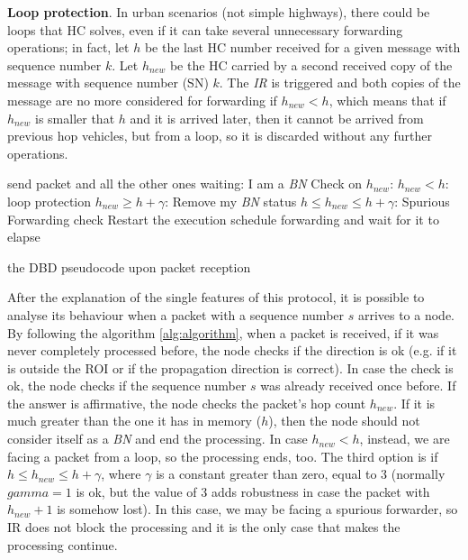 \documentclass{sig-alternate-2013}
\begin{document}
\textbf{Loop protection}. In urban scenarios (not simple highways), there could be loops that HC solves, even if it can take several unnecessary forwarding operations; in fact, let $h$ be the last HC number received for a given message with sequence number $k$. Let $h_{new}$ be the HC carried by a second received copy of the message with sequence number (SN) $k$. The \textit{IR} is triggered and both copies of the message are no more considered for forwarding if $h_{new}<h$, which means that if $h_{new}$ is smaller that $h$ and it is arrived later, then it cannot be arrived from previous hop vehicles, but from a loop, so it is discarded without any further operations.

\begin{algorithm}
\begin{algorithmic}
						\State {}
				    \EndIf
			    \Else {} 
			    \EndIf
		\Else {} 
	    \EndIf
\EndIf
\State
{}
    \State send packet and all the other ones waiting: I am a \textit{BN}
\EndFunction
{}
	\State Check on $h_{new}$:
	\State $h_{new}<h$: loop protection
	\State $h_{new} \geqslant h + \gamma$: Remove my \textit{BN} status
	\State $h \leqslant h_{new} \leqslant h + \gamma$: Spurious Forwarding check
	\State Restart the execution
\EndFunction
{}
			\State schedule forwarding and wait for it to elapse
			 
			\Else {} 
			\EndIf
\EndFunction
\caption{the DBD pseudocode upon packet reception}
\label{alg:algorithm}
\end{algorithmic}
\end{algorithm}

After the explanation of the single features of this protocol, it is possible to analyse its behaviour when a packet with a sequence number $s$ arrives to a node. By following the algorithm \ref{alg:algorithm}, when a packet is received, if it was never completely processed before, the node checks if the direction is ok (e.g. if it is outside the ROI or if the propagation direction is correct). In case the check is ok, the node checks if the sequence number $s$ was already received once before. If the answer is affirmative, the node checks the packet's hop count $h_{new}$. If it is much greater than the one it has in memory ($h$), then the node should not consider itself as a \textit{BN} and end the processing.
In case $h_{new}<h$, instead, we are facing a packet from a loop, so the processing ends, too. The third option is if $h \leqslant h_{new} \leqslant h+\gamma$, where $\gamma$ is a constant greater than zero, equal to 3 (normally $gamma=1$ is ok, but the value of 3 adds robustness in case the packet with $h_{new}+1$ is somehow lost). In this case, we may be facing a spurious forwarder, so IR does not block the processing and it is the only case that makes the processing continue.
\end{document}
